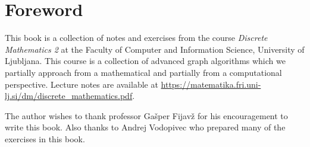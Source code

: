 
\chapter*{Foreword}

This book is a collection of notes and exercises from the course \textit{Discrete Mathematics 2} at the Faculty of Computer and Information Science, University of Ljubljana. This course is a collection of advanced graph algorithms which we partially approach from a mathematical and partially from a computational perspective.
Lecture notes are available at \url{https://matematika.fri.uni-lj.si/dm/discrete_mathematics.pdf}.

The author wishes to thank professor Gašper Fijavž for his encouragement to write this book. Also thanks to Andrej Vodopivec who prepared many of the exercises in this book.